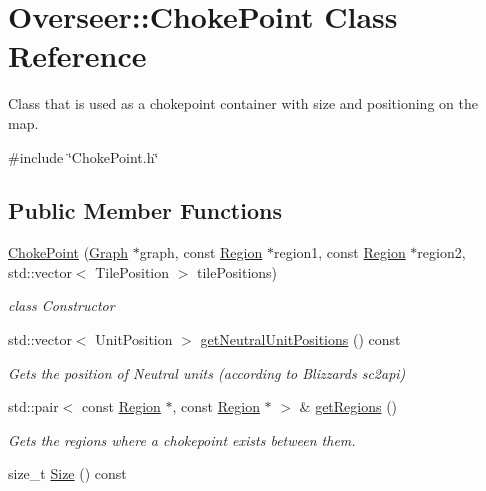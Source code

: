 \hypertarget{classOverseer_1_1ChokePoint}{}\section{Overseer\+:\+:Choke\+Point Class Reference}
\label{classOverseer_1_1ChokePoint}


Class that is used as a chokepoint container with size and positioning on the map.  




{\ttfamily \#include \char`\"{}Choke\+Point.\+h\char`\"{}}

\subsection*{Public Member Functions}
\begin{DoxyCompactItemize}
\item 
\hyperlink{classOverseer_1_1ChokePoint_a931b3cd819ec712833ae3857dcab4f7a}{Choke\+Point} (\hyperlink{classOverseer_1_1Graph}{Graph} $\ast$graph, const \hyperlink{classOverseer_1_1Region}{Region} $\ast$region1, const \hyperlink{classOverseer_1_1Region}{Region} $\ast$region2, std\+::vector$<$ Tile\+Position $>$ tile\+Positions)
\begin{DoxyCompactList}\small\item\em class Constructor \end{DoxyCompactList}\item 
std\+::vector$<$ Unit\+Position $>$ \hyperlink{classOverseer_1_1ChokePoint_a94f3028b9d3ea8630500f721d6fa036d}{get\+Neutral\+Unit\+Positions} () const 
\begin{DoxyCompactList}\small\item\em Gets the position of Neutral units (according to Blizzard\textquotesingle{}s sc2api) \end{DoxyCompactList}\item 
std\+::pair$<$ const \hyperlink{classOverseer_1_1Region}{Region} $\ast$, const \hyperlink{classOverseer_1_1Region}{Region} $\ast$ $>$ \& \hyperlink{classOverseer_1_1ChokePoint_aa01d980ee19449f5e4557b8bc036a4e7}{get\+Regions} ()
\begin{DoxyCompactList}\small\item\em Gets the regions where a chokepoint exists between them. \end{DoxyCompactList}\item 
size\+\_\+t \hyperlink{classOverseer_1_1ChokePoint_a7fd40fd88577c1bbf5c462fe03485f15}{Size} () const 

\end{DoxyCompactItemize}
